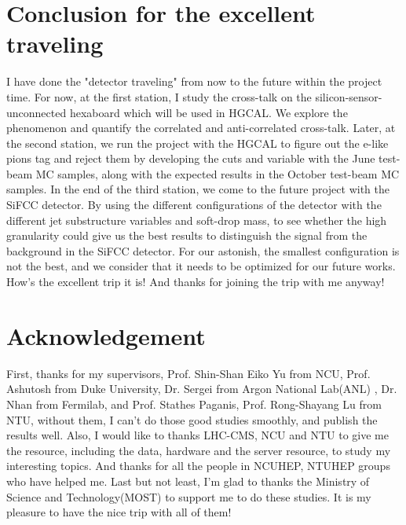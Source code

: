 \documentclass[12pt,twoside,a4paper,an,final]{cms-tdr}
\begin{document}
\section{Conclusion for the excellent traveling}
I have done the "detector traveling" from now to the future within the project time. For now, at the first station, I study the cross-talk on the silicon-sensor-unconnected hexaboard which will be used in HGCAL. We explore the phenomenon and quantify the correlated and anti-correlated cross-talk. Later, at the second station, we run the project with the HGCAL to figure out the e-like pions tag and reject them by developing the cuts and variable with the June test-beam MC samples, along with the expected results in the October test-beam MC samples. In the end of the third station, we come to the future project with the SiFCC detector. By using the different configurations of the detector with the different jet substructure variables and soft-drop mass, to see whether the high granularity could give us the best results to distinguish the signal from the background in the SiFCC detector. For our astonish, the smallest configuration is not the best, and we consider that it needs to be optimized for our future works. How's the excellent trip it is! And thanks for joining the trip with me anyway!

\section{Acknowledgement}
First, thanks for my supervisors, Prof. Shin-Shan Eiko Yu from NCU, Prof. Ashutosh from Duke University, Dr. Sergei from Argon National Lab(ANL) , Dr. Nhan from Fermilab, and Prof. Stathes Paganis, Prof. Rong-Shayang Lu from NTU, without them, I can't do those good studies smoothly, and publish the results well. Also, I would like to thanks LHC-CMS, NCU and NTU to give me the resource, including the data, hardware and the server resource, to study my interesting topics. And thanks for all the people in NCUHEP, NTUHEP groups who have helped me. Last but not least, I'm glad to thanks the Ministry of Science and Technology(MOST) to support me to do these studies. It is my pleasure to have the nice trip with all of them!
\end{document}
